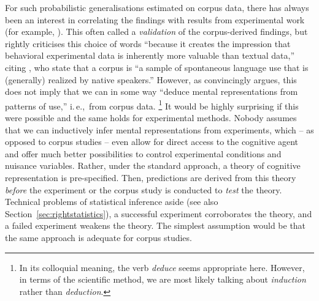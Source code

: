 \documentclass[USenglish]{article}
\newcommand{\ie}{i.\,e.,}
\begin{document}
For such probabilistic generalisations estimated on corpus data, there has always been an interest in correlating the findings with results from experimental work (for example, \citealp{ArppeJaervikivi2007,BresnanEa2007,BresnanFord2010,DivjakGries2008,DivjakEa2016,FordBresnan2013}).
This often called a \textit{validation} of the corpus-derived findings, but \citet[303]{Divjak2016a} rightly criticises this choice of words ``because it creates the impression that behavioral experimental data is inherently more valuable than textual data,'' citing \cite{TummersEa2005}, who state that a corpus is ``a sample of spontaneous language use that is (generally) realized by native speakers.''
However, as \citet[486--487]{Dabrowska2016} convincingly argues, this does not imply that we can in some way ``deduce mental representations from patterns of use,'' \ie\ from corpus data.%
\footnote{In its colloquial meaning, the verb \textit{deduce} seems appropriate here.
However, in terms of the scientific method, we are most likely talking about \textit{induction} rather than \textit{deduction}.}
It would be highly surprising if this were possible and the same holds for experimental methods.
Nobody assumes that we can inductively infer mental representations from experiments, which -- as opposed to corpus studies -- even allow for direct access to the cognitive agent and offer much better possibilities to control experimental conditions and nuisance variables.
Rather, under the standard approach, a theory of cognitive representation is pre-specified.
Then, predictions are derived from this theory \textit{before} the experiment or the corpus study is conducted to \textit{test} the theory.
Technical problems of statistical inference aside (see also Section~\ref{sec:rightstatistics}), a successful experiment corroborates the theory, and a failed experiment weakens the theory.
The simplest assumption would be that the same approach is adequate for corpus studies.
\end{document}
